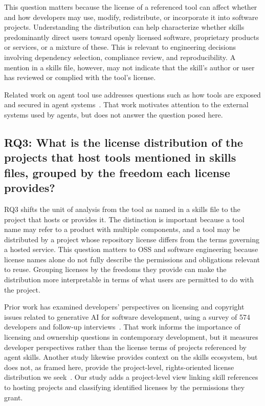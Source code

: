 This question matters because the license of a referenced tool can affect whether and how developers may use, modify, redistribute, or incorporate it into software projects.
Understanding the distribution can help characterize whether skills predominantly direct users toward openly licensed software, proprietary products or services, or a mixture of these.
This is relevant to engineering decisions involving dependency selection, compliance review, and reproducibility.
A mention in a skills file, however, may not indicate that the skill's author or user has reviewed or complied with the tool's license.

Related work on agent tool use addresses questions such as how tools are exposed and secured in agent systems~\cite{10.1145/3786335.3813145}.
That work motivates attention to the external systems used by agents, but does not answer the question posed here.

\subsection*{RQ3: What is the license distribution of the projects that host tools mentioned in skills files, grouped by the freedom each license provides?}

RQ3 shifts the unit of analysis from the tool as named in a skills file to the project that hosts or provides it.
The distinction is important because a tool name may refer to a product with multiple components, and a tool may be distributed by a project whose repository license differs from the terms governing a hosted service.
This question matters to OSS and software engineering because license names alone do not fully describe the permissions and obligations relevant to reuse.
Grouping licenses by the freedoms they provide can make the distribution more interpretable in terms of what users are permitted to do with the project.

Prior work has examined developers' perspectives on licensing and copyright issues related to generative AI for software development, using a survey of 574 developers and follow-up interviews~\cite{stalnaker2026developerperspectives}.
That work informs the importance of licensing and ownership questions in contemporary development, but it measures developer perspectives rather than the license terms of projects referenced by agent skills.
Another study likewise provides context on the skills ecosystem, but does not, as framed here, provide the project-level, rights-oriented license distribution we seek~\cite{10.1145/3770855.3818652}.
Our study adds a project-level view linking skill references to hosting projects and classifying identified licenses by the permissions they grant.
